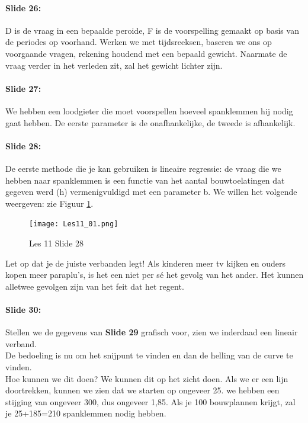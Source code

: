 \documentclass[10pt,a4paper]{report}
\begin{document}
\paragraph{Slide 26:} D is de vraag in een bepaalde peroide, F is de voorspelling gemaakt op basis van de periodes op voorhand. Werken we met tijdsreeksen, baseren we ons op voorgaande vragen, rekening houdend met een bepaald gewicht. Naarmate de vraag verder in het verleden zit, zal het gewicht lichter zijn.

\paragraph{Slide 27:} We hebben een loodgieter die moet voorspellen hoeveel spanklemmen hij nodig gaat hebben. De eerste parameter is de onafhankelijke, de tweede is afhankelijk.

\paragraph{Slide 28:} De eerste methode die je kan gebruiken is lineaire regressie: de vraag die we hebben naar spanklemmen is een functie van het aantal bouwtoelatingen dat gegeven werd (h) vermenigvuldigd met een parameter b. We willen het volgende weergeven: zie Figuur \ref{les11_01}.\\

\begin{figure}[h!]
\centering
\texttt{[image: Les11\_01.png]}
\caption{Les 11 Slide 28} 
\label{les11_01}
\end{figure}

Let op dat je de juiste verbanden legt! Als kinderen meer tv kijken en ouders kopen meer paraplu's, is het een niet per s\'e het gevolg van het ander. Het kunnen alletwee gevolgen zijn van het feit dat het regent.

\paragraph{Slide 30:} Stellen we de gegevens van \textbf{Slide 29} grafisch voor, zien we inderdaad een lineair verband.\\
De bedoeling is nu om het snijpunt te vinden en dan de helling van de curve te vinden.\\
Hoe kunnen we dit doen? We kunnen dit op het zicht doen. Als we er een lijn doortrekken, kunnen we zien dat we starten op ongeveer 25. we hebben een stijging van ongeveer 300, dus ongeveer 1,85. Als je 100 bouwplannen krijgt, zal je 25+185=210 spanklemmen nodig hebben.
\end{document}
